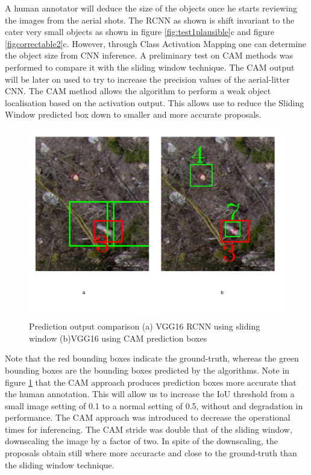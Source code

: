 \documentclass{IEEEtran}
\begin{document}
A human annotator will deduce the size of the objects once he starts reviewing the images from the aerial shots. The RCNN as shown is shift invariant to the cater very small objects as shown in figure \ref{fig:test1plausible}c and figure \ref{figcorrectable2}c. However, through Class Activation Mapping  one can determine the object size from CNN inference. A preliminary test on CAM methods was performed to compare it with the sliding window technique. The CAM output will be later on used to try to increase the precision values of the aerial-litter CNN. The CAM method allows the algorithm to perform a weak object localisation based on the activation output. This allows use to reduce the Sliding Window predicted box down to smaller and more accurate proposals.

\begin{figure}[H]
\centering
\includegraphics[scale=0.3]{images/cam-output.png}
\caption{Prediction output comparison (a)  VGG16 RCNN using sliding window (b)VGG16 using CAM prediction boxes }
\label{fig:camoutput}
\end{figure}

Note that the red bounding boxes indicate the ground-truth, whereas the green bounding boxes are the bounding boxes predicted by the algorithms. Note in figure \ref{fig:camoutput} that the CAM approach produces prediction boxes more accurate that the human annotation.
This will allow us to increase the IoU threshold from a small image setting of 0.1 to a normal setting of 0.5, without and degradation in performance. The CAM approach was introduced to decrease the operational times for inferencing. The CAM stride was double that of the sliding window, downscaling the image by a factor of two. In spite of the downscaling, the proposals obtain still where more accuracte and close to the ground-truth than the sliding window technique.\newline
\end{document}

